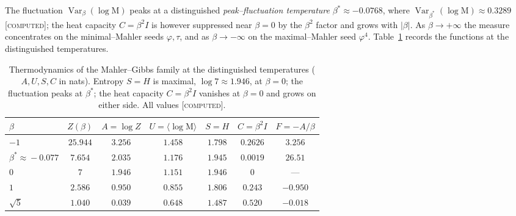 \documentclass[11pt]{article}
\theoremstyle{definition}
\newcommand{\ph}{\varphi}
\newcommand{\Mah}{\mathrm{M}}
\newcommand{\Var}{\operatorname{Var}}
\newcommand{\computedtag}{{\scshape [computed]}}
\begin{document}
The fluctuation $\Var_\beta(\log\Mah)$ peaks at a distinguished \emph{peak--fluctuation temperature}
$\beta^\ast\approx-0.0768$, where $\Var_{\beta^\ast}(\log\Mah)\approx0.3289$ \computedtag; the heat
capacity $C=\beta^2 I$ is however suppressed near $\beta=0$ by the $\beta^2$ factor and grows with
$|\beta|$. As $\beta\to+\infty$ the measure concentrates on the minimal--Mahler seeds $\ph,\tau$, and
as $\beta\to-\infty$ on the maximal--Mahler seed $\ph^4$. Table~\ref{tab:thermo} records the
functions at the distinguished temperatures.

\begin{table}[h]\centering
\begin{tabular}{lcccccc}
\toprule
$\beta$ & $Z(\beta)$ & $A=\log Z$ & $U=\langle\log\Mah\rangle$ & $S=H$ & $C=\beta^2 I$ & $F=-A/\beta$\\ \midrule
$-1$ & $25.944$ & $3.256$ & $1.458$ & $1.798$ & $0.2626$ & $3.256$\\
$\beta^\ast\!\approx\!-0.077$ & $7.654$ & $2.035$ & $1.176$ & $1.945$ & $0.0019$ & $26.51$\\
$0$ & $7$ & $1.946$ & $1.151$ & $1.946$ & $0$ & ---\\
$1$ & $2.586$ & $0.950$ & $0.855$ & $1.806$ & $0.243$ & $-0.950$\\
$\sqrt5$ & $1.040$ & $0.039$ & $0.648$ & $1.487$ & $0.520$ & $-0.018$\\
\bottomrule
\end{tabular}
\caption{Thermodynamics of the Mahler--Gibbs family at the distinguished temperatures ($A,U,S,C$ in
nats). Entropy $S=H$ is maximal, $\log 7\approx1.946$, at $\beta=0$; the fluctuation peaks at
$\beta^\ast$; the heat capacity $C=\beta^2 I$ vanishes at $\beta=0$ and grows on either side. All
values \computedtag.}\label{tab:thermo}
\end{table}
\end{document}

